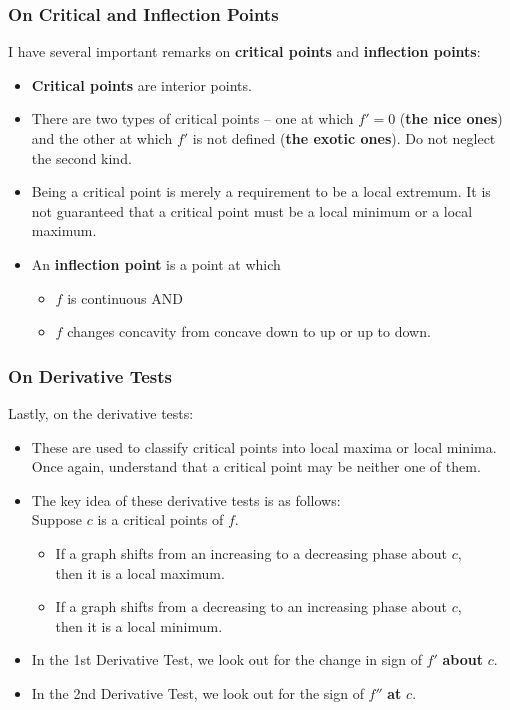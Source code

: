 \documentclass[10pt,t,handout,ignorenonframetext,aspectratio=169]{beamer}
\begin{document}
\begin{frame}
  \frametitle{On Critical and Inflection Points}
  I have several important remarks on \textbf{critical points} and
  \textbf{inflection points}:
  \begin{itemize}
  \item \textbf{Critical points} are interior points.
  \item There are two types of critical points -- one at which $f'=0$
    (\textbf{the nice ones}) and the other at which $f'$ is not
    defined (\textbf{the exotic ones}). Do not neglect the second
    kind.
  \item Being a critical point is merely a requirement to be a local
    extremum. It is not guaranteed that a critical point must be a
    local minimum or a local maximum.
  \item An \textbf{inflection point} is a point at which
    \begin{itemize}
    \item $f$ is continuous AND
    \item $f$ changes concavity from concave down to up or up to down.
    \end{itemize}
  \end{itemize}
\end{frame}


\begin{frame}
  \frametitle{On Derivative Tests}
  Lastly, on the derivative tests:
  \begingroup
  \small
  \begin{itemize}
  \item These are used to classify critical points into local maxima or local minima. Once again, understand that a critical point may be neither one of them.
  \item The key idea of these derivative tests is as follows: \\
    Suppose $c$ is a critical points of $f$.
    \begin{itemize}
    \item If a graph shifts from an increasing to a decreasing phase about $c$, \\ then it is a local maximum.
    \item If a graph shifts from a decreasing to an increasing phase about $c$, \\ then it is a local minimum.
    \end{itemize}
  \item In the 1st Derivative Test, we look out for the change in sign of $f'$ \textbf{about} $c$.
  \item In the 2nd Derivative Test, we look out for the sign of $f''$ \textbf{at} $c$.
  \end{itemize}
  \endgroup
\end{frame}
\end{document}

